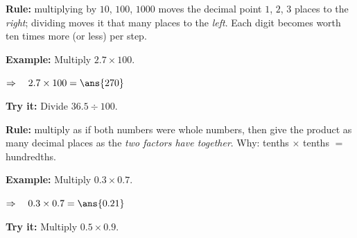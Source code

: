 \documentclass[12pt]{article}
\begin{document}


\begin{formulabox}
\textbf{Rule:} multiplying by $10$, $100$, $1000$ moves the decimal point
$1$, $2$, $3$ places to the \emph{right}; dividing moves it that many places
to the \emph{left}. Each digit becomes worth ten times more (or less) per
step.
\end{formulabox}

\begin{examplebox}
\textbf{Example:} \quad Multiply $2.7 \times 100$.

$\Rightarrow\quad 2.7 \times 100 = \ans{270}$
\end{examplebox}

\begin{tryitbox}
\textbf{Try it:} \quad Divide $36.5 \div 100$.\\[2pt]
\end{tryitbox}


\begin{formulabox}
\textbf{Rule:} multiply as if both numbers were whole numbers, then give the
product as many decimal places as the \emph{two factors have together}.
Why: tenths $\times$ tenths $=$ hundredths.
\end{formulabox}

\begin{examplebox}
\textbf{Example:} \quad Multiply $0.3 \times 0.7$.

$\Rightarrow\quad 0.3 \times 0.7 = \ans{0.21}$
\end{examplebox}

\begin{tryitbox}
\textbf{Try it:} \quad Multiply $0.5 \times 0.9$.\\[2pt]
\end{tryitbox}
\end{document}
